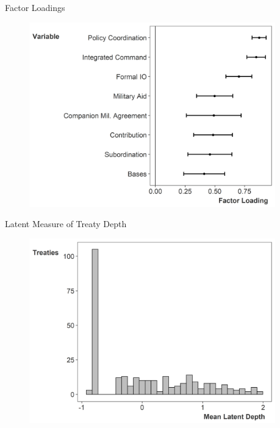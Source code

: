 \documentclass[12pt]{beamer}
\begin{document}

\begin{frame}{Factor Loadings}


\begin{figure}
	\centering
		\includegraphics[width=0.95\textwidth]{factor-loadings.png}
\end{figure}


\end{frame}


\begin{frame}{Latent Measure of Treaty Depth}

\begin{figure}[htbp]
	\centering
		\includegraphics[width=0.95\textwidth]{ld-hist.png}
\end{figure}


\end{frame} 
\end{document}
